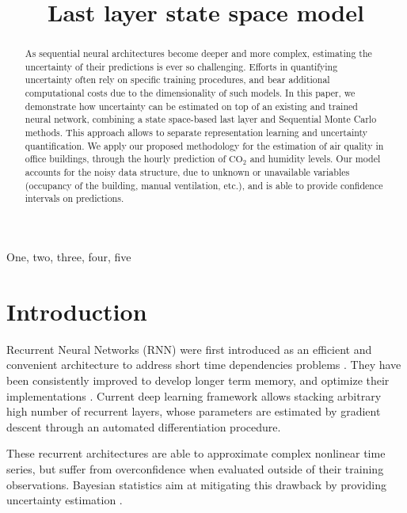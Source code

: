 \documentclass{article}
\title{Last layer state space model}
\begin{document}
\maketitle

\begin{abstract}
	As sequential neural architectures become deeper and more complex, estimating the uncertainty of their predictions is ever so challenging.
	Efforts in quantifying uncertainty often rely on specific training procedures, and bear additional computational costs due to the dimensionality of such models.
	In this paper, we demonstrate how uncertainty can be estimated on top of an existing and trained neural network, combining a state space-based last  layer and  Sequential Monte Carlo methods. This approach allows to separate representation learning and uncertainty quantification. We apply our proposed methodology for the estimation of air quality in office buildings, through the hourly prediction of \ensuremath{\mathrm{CO_2}} and humidity levels.
	Our model accounts for the noisy data structure, due to unknown or unavailable variables (occupancy of the building, manual ventilation, etc.), and is able to provide confidence intervals on predictions.
\end{abstract}

\begin{keywords}
	One, two, three, four, five
\end{keywords}

\section{Introduction}
\label{sec:intro}

Recurrent Neural Networks (RNN) were first introduced as an efficient and convenient architecture to address short time dependencies problems \cite{Mozer1989AFB}.
They have been consistently improved to develop longer term memory, and optimize their implementations \cite{Bengio1994LearningLD,Hochreiter1997LongSM,Cho2014LearningPR}.
Current deep learning framework allows stacking arbitrary high number of recurrent layers, whose parameters are estimated by gradient descent through an automated differentiation procedure.

These recurrent architectures are able to approximate complex nonlinear time series, but suffer from overconfidence when evaluated outside of their training observations. Bayesian statistics aim at mitigating this drawback by providing uncertainty estimation \cite{Hinton1995BayesianLF,MacKay1992}.
\end{document}
